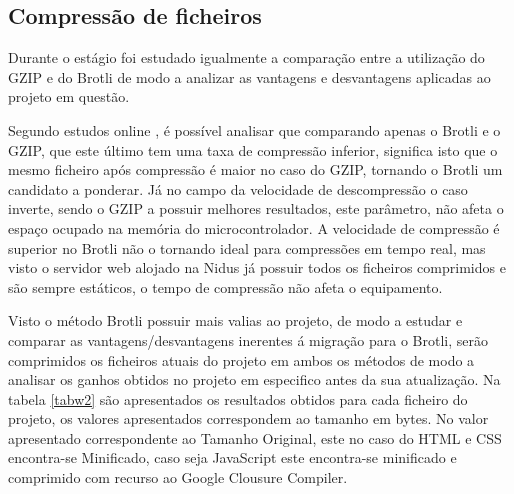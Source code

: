 \subsection{Compressão de ficheiros}

\par Durante o estágio foi estudado igualmente a comparação entre a utilização do GZIP e do Brotli de modo a analizar as vantagens e desvantagens aplicadas ao projeto em questão.
\par Segundo estudos online \cite{brotlivsgzip}, é possível analisar que comparando apenas o Brotli e o GZIP, que este último tem uma taxa de compressão inferior, significa isto que o mesmo ficheiro após compressão é maior no caso do GZIP, tornando o Brotli um candidato a ponderar. Já no campo da velocidade de descompressão o caso inverte, sendo o GZIP a possuir melhores resultados, este parâmetro, não afeta o espaço ocupado na memória do microcontrolador. A velocidade de compressão é superior no Brotli não o tornando ideal para compressões em tempo real, mas visto o servidor web alojado na Nidus já possuir todos os ficheiros comprimidos e são sempre estáticos, o tempo de compressão não afeta o equipamento. 
\par Visto o método Brotli possuir mais valias ao projeto, de modo a estudar e comparar as vantagens/desvantagens inerentes á migração para o Brotli, serão comprimidos os ficheiros atuais do projeto em ambos os métodos de modo a analisar os ganhos obtidos no projeto em especifico antes da sua atualização. Na tabela \ref{tabw2} são apresentados os resultados obtidos para cada ficheiro do projeto, os valores apresentados correspondem ao tamanho em bytes. No valor apresentado correspondente ao Tamanho Original, este no caso do HTML e CSS encontra-se Minificado, caso seja JavaScript este encontra-se minificado e comprimido com recurso ao Google Clousure Compiler.


